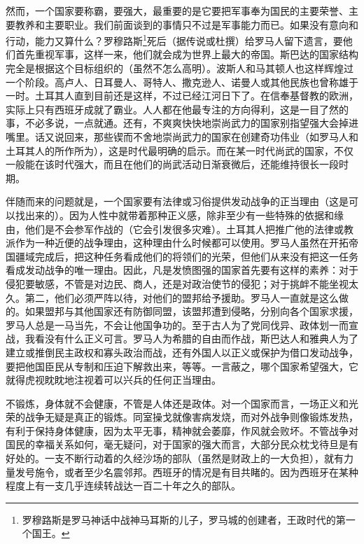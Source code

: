 \par 然而，一个国家要称霸，要强大，最重要的是它要把军事奉为国民的主要荣誉、主要教养和主要职业。我们前面谈到的事情只不过是军事能力而已。如果没有意向和行动，能力又算什么？罗穆路斯\footnote{罗穆路斯是罗马神话中战神马耳斯的儿子，罗马城的创建者，王政时代的第一个国王。}死后（据传说或杜撰）给罗马人留下遗言，要他们首先重视军事，这样一来，他们就会成为世界上最大的帝国。斯巴达的国家结构完全是根据这个目标组织的（虽然不怎么高明）。波斯人和马其顿人也这样辉煌过一个阶段。高卢人、日耳曼人、哥特人、撒克逊人、诺曼人或其他民族也曾称雄于一时。土耳其人直到目前还是这样，不过已经江河日下了。在信奉基督教的欧洲，实际上只有西班牙成就了霸业。人人都在他最专注的方向得利，这是一目了然的事，不必多说，一点就通。还有，不爽爽快快地崇尚武力的国家别指望强大会掉进嘴里。话又说回来，那些锲而不舍地崇尚武力的国家在创建奇功伟业（如罗马人和土耳其人的所作所为），这是时代最明确的启示。而在某一时代尚武的国家，不仅一般能在该时代强大，而且在他们的尚武活动日渐衰微后，还能维持很长一段时期。
\par 伴随而来的问题就是，一个国家要有法律或习俗提供发动战争的正当理由（这是可以找出来的）。因为人性中就带着那种正义感，除非至少有一些特殊的依据和缘由，他们是不会参军作战的（它会引发很多灾难）。土耳其人把推广他的法律或教派作为一种近便的战争理由，这种理由什么时候都可以使用。罗马人虽然在开拓帝国疆域完成后，把这种任务看成他们的将领们的光荣，但他们从来没有把这一任务看成发动战争的唯一理由。因此，凡是发愤图强的国家首先要有这样的素养：对于侵犯要敏感，不管是对边民、商人，还是对政治使节的侵犯；对于挑衅不能坐视太久。第二，他们必须严阵以待，对他们的盟邦给予援助。罗马人一直就是这么做的。如果盟邦与其他国家还有防御同盟，该盟邦遭到侵略，分别向各个国家求援，罗马人总是一马当先，不会让他国争功的。至于古人为了党同伐异、政体划一而宣战，我看没有什么正义可言。罗马人为希腊的自由而作战，斯巴达人和雅典人为了建立或推倒民主政权和寡头政治而战，还有外国人以正义或保护为借口发动战争，要把他国臣民从专制和压迫下解救出来，等等。一言蔽之，哪个国家希望强大，它就得虎视眈眈地注视着可以兴兵的任何正当理由。
\par 不锻炼，身体就不会健康，不管是人体还是政体。对一个国家而言，一场正义和光荣的战争无疑是真正的锻炼。同室操戈就像害病发烧，而对外战争则像锻炼发热，有利于保持身体健康，因为太平无事，精神就会萎靡，作风就会败坏。不管战争对国民的幸福关系如何，毫无疑问，对于国家的强大而言，大部分民众枕戈待旦是有好处的。一支不断行动着的久经沙场的部队（虽然是财政上的一大负担），就有力量发号施令，或者至少名震邻邦。西班牙的情况是有目共睹的。因为西班牙在某种程度上有一支几乎连续转战达一百二十年之久的部队。
